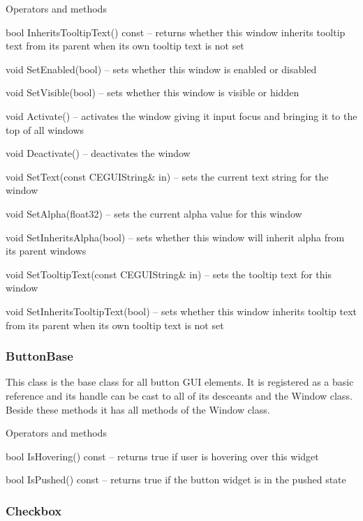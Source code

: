 \begin{titled-itemize}{Operators and methods}
  \item bool InheritsTooltipText() const -- returns whether this window inherits tooltip text from its parent when
 its own tooltip text is not set
  \item void SetEnabled(bool) -- sets whether this window is enabled or disabled
  \item void SetVisible(bool) -- sets whether this window is visible or hidden
  \item void Activate() -- activates the window giving it input focus and bringing it to the top of
 all windows
  \item void Deactivate() -- deactivates the window
  \item void SetText(const CEGUIString\& in) -- sets the current text string for the window
  \item void SetAlpha(float32) -- sets the current alpha value for this window
  \item void SetInheritsAlpha(bool) -- sets whether this window will inherit alpha from its parent windows
  \item void SetTooltipText(const CEGUIString\& in) -- sets the tooltip text for this window
  \item void SetInheritsTooltipText(bool) -- sets whether this window inherits tooltip text from its parent when its
 own tooltip text is not set
\end{titled-itemize}

\subsubsection{ButtonBase}

This class is the base class for all button GUI elements. It is registered as a basic reference and its handle can be cast to all of its desceants and the Window class. Beside these methods it has all methods of the Window class.

\begin{titled-itemize}{Operators and methods}
  \item bool IsHovering() const -- returns true if user is hovering over this widget
  \item bool IsPushed() const -- returns true if the button widget is in the pushed state
\end{titled-itemize}

\subsubsection{Checkbox}

